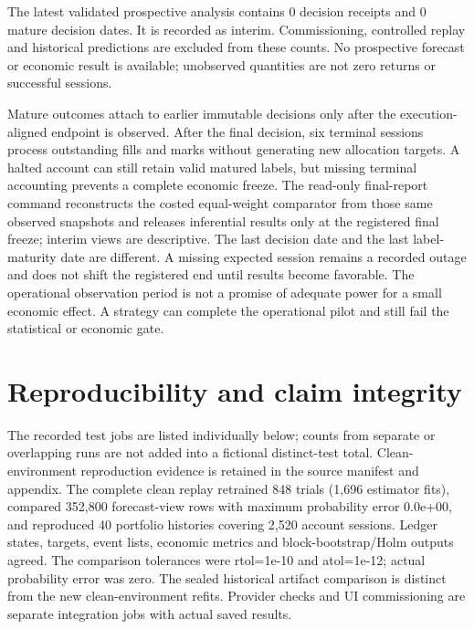 \documentclass[11pt,a4paper]{article}
\begin{document}


The latest validated prospective analysis contains 0 decision receipts and 0 mature decision dates. It is recorded as interim. Commissioning, controlled replay and historical predictions are excluded from these counts. No prospective forecast or economic result is available; unobserved quantities are not zero returns or successful sessions.

Mature outcomes attach to earlier immutable decisions only after the execution-aligned endpoint is observed. After the final decision, six terminal sessions process outstanding fills and marks without generating new allocation targets. A halted account can still retain valid matured labels, but missing terminal accounting prevents a complete economic freeze. The read-only final-report command reconstructs the costed equal-weight comparator from those same observed snapshots and releases inferential results only at the registered final freeze; interim views are descriptive. The last decision date and the last label-maturity date are different. A missing expected session remains a recorded outage and does not shift the registered end until results become favorable. The operational observation period is not a promise of adequate power for a small economic effect. A strategy can complete the operational pilot and still fail the statistical or economic gate.


\section{Reproducibility and claim integrity}\label{sec:section-10}

The recorded test jobs are listed individually below; counts from separate or overlapping runs are not added into a fictional distinct-test total. Clean-environment reproduction evidence is retained in the source manifest and appendix. The complete clean replay retrained 848 trials (1,696 estimator fits), compared 352,800 forecast-view rows with maximum probability error 0.0e+00, and reproduced 40 portfolio histories covering 2,520 account sessions. Ledger states, targets, event lists, economic metrics and block-bootstrap/Holm outputs agreed. The comparison tolerances were rtol=1e-10 and atol=1e-12; actual probability error was zero. The sealed historical artifact comparison is distinct from the new clean-environment refits. Provider checks and UI commissioning are separate integration jobs with actual saved results.
\end{document}
